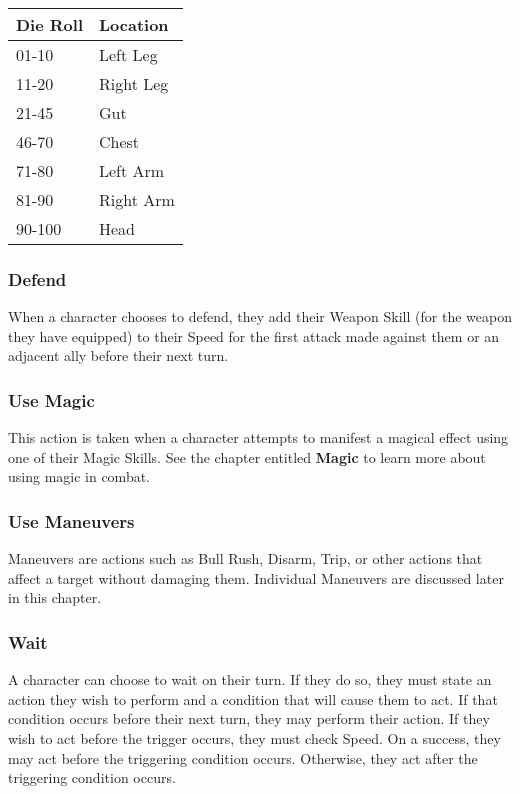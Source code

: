 \documentclass[oneside]{book}
\begin{document}
\begin{multicols}{2}
\begin{center}
\begin{tabular}{|l|l|}
\hline
\rowcolor[HTML]{9B9B9B} 
\textbf{Die Roll} & \textbf{Location} \\ \hline
01-10             & Left Leg          \\ \hline
\rowcolor[HTML]{EFEFEF} 
11-20             & Right Leg         \\ \hline
21-45             & Gut               \\ \hline
\rowcolor[HTML]{EFEFEF} 
46-70             & Chest             \\ \hline
71-80             & Left Arm          \\ \hline
\rowcolor[HTML]{EFEFEF} 
81-90             & Right Arm         \\ \hline
90-100            & Head              \\ \hline
\end{tabular}
\end{center}

\subsubsection{Defend}
When a character chooses to defend, they add their Weapon Skill (for the weapon they have equipped) to their Speed for the first attack made against them or an adjacent ally before their next turn. 

\subsubsection{Use Magic}
This action is taken when a character attempts to manifest a magical effect using one of their Magic Skills. See the chapter entitled \textbf{Magic} to learn more about using magic in combat.

\subsubsection{Use Maneuvers}
Maneuvers are actions such as Bull Rush, Disarm, Trip, or other actions that affect a target without damaging them. Individual Maneuvers are discussed later in this chapter. 

\subsubsection{Wait}
A character can choose to wait on their turn. If they do so, they must state an action they wish to perform and a condition that will cause them to act. If that condition occurs before their next turn, they may perform their action. If they wish to act before the trigger occurs, they must check Speed. On a success, they may act before the triggering condition occurs. Otherwise, they act after the triggering condition occurs.


\end{multicols}
\end{document}
